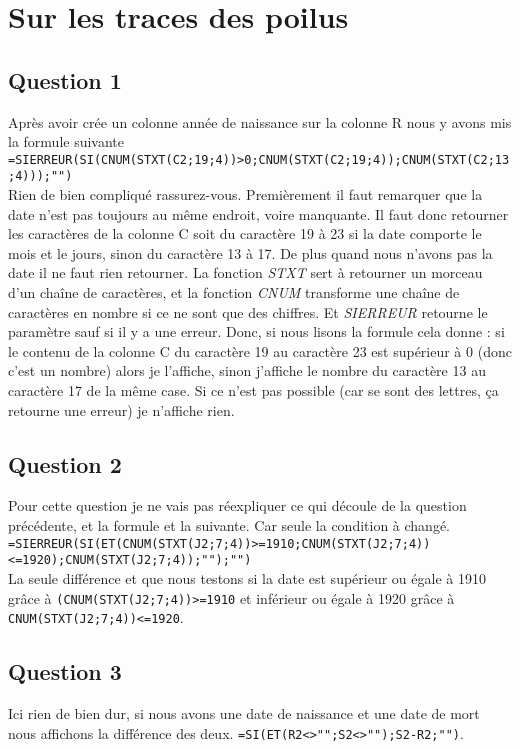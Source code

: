 \documentclass[10pt,a4paper]{article}
\begin{document}
\section{Sur les traces des poilus}

\subsection{Question 1}
Après avoir crée un colonne année de naissance sur la colonne R nous y avons mis la formule suivante\\
\verb|=SIERREUR(SI(CNUM(STXT(C2;19;4))>0;CNUM(STXT(C2;19;4));CNUM(STXT(C2;13;4)));"")|\\
Rien de bien compliqué rassurez-vous. Premièrement il faut remarquer que la date n'est pas toujours au même endroit, voire manquante. Il faut donc retourner les caractères de la colonne C soit du caractère 19 à 23 si la date comporte le mois et le jours, sinon du caractère 13 à 17. De plus quand nous n'avons pas la date il ne faut rien retourner. La fonction \textit{STXT} sert à retourner un morceau d'un chaîne de caractères, et la fonction \textit{CNUM} transforme une chaîne de caractères en nombre si ce ne sont que des chiffres. Et \textit{SIERREUR} retourne le paramètre sauf si il y a une erreur. Donc, si nous lisons la formule cela donne : si le contenu de la colonne C du caractère 19 au caractère 23 est supérieur à 0 (donc c'est un nombre) alors je l'affiche, sinon j'affiche le nombre du caractère 13 au caractère 17 de la même case. Si ce n'est pas possible (car se sont des lettres, ça retourne une erreur) je n'affiche rien. 

\subsection{Question 2}
Pour cette question je ne vais pas réexpliquer ce qui découle de la question précédente, et la formule et la suivante. Car seule la condition à changé. \\
\verb|=SIERREUR(SI(ET(CNUM(STXT(J2;7;4))>=1910;CNUM(STXT(J2;7;4))<=1920);CNUM(STXT(J2;7;4));"");"")|\\
La seule différence et que nous testons si la date est supérieur ou égale à 1910 grâce à  \verb|(CNUM(STXT(J2;7;4))>=1910| et inférieur ou égale à 1920 grâce à \verb|CNUM(STXT(J2;7;4))<=1920|.

\subsection{Question 3}
Ici rien de bien dur, si nous avons une date de naissance et une date de mort nous affichons la différence des deux. \verb|=SI(ET(R2<>"";S2<>"");S2-R2;"")|.
\end{document}
